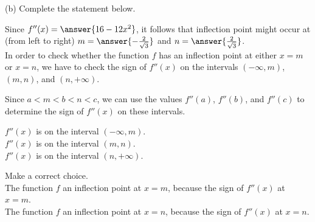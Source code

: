 \documentclass{ximera}
\begin{document}
\begin{exercise}
\begin{exercise}
\begin{exercise}
\begin{exercise}
\begin{exercise}
(b) Complete the statement below.
\begin{exercise}

Since $f''(x)=\answer{16-12x^2}$, it follows that inflection point might occur at  (from left to right) $m=\answer{-\frac{2}{\sqrt{3}}}$ and $n=\answer{\frac{2}{\sqrt{3}}}$.\\

In order to check whether the function $f$ has an inflection point at either $x=m$ or $x=n$, we have to check the sign of $f''(x)$ on the intervals $(-\infty,m)$, $(m,n)$, and $(n,+\infty)$.

Since $a < m < b < n < c$, we can use the values $f''(a)$, $f''(b)$, and $f''(c)$ to determine the sign of $f''(x)$ on these intervals.
\begin{exercise}


 $f''(x)$ is  on the interval $(-\infty,m)$.\\
 
  $f''(x)$ is  on the interval $(m,n)$.\\
  
    $f''(x)$ is  on the interval  $(n,+\infty)$.\\
  \begin{exercise}
 Make a correct choice.\\
 
  The function $f$  an inflection point at $x=m$, because the sign of $f''(x)$ at $x=m$.\\
  The function $f$  an inflection point at $x=n$, because the sign of $f''(x)$ at $x=n$.\\
 
  \end{exercise}
 \end{exercise}
\end{exercise}
\end{exercise}
\end{exercise}
\end{exercise}
\end{exercise}
\end{exercise}
\end{document}
